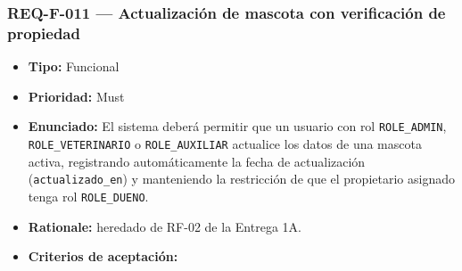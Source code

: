 \documentclass[
  spanish,
]{article}
\providecommand{\tightlist}{%
  \setlength{\itemsep}{0pt}\setlength{\parskip}{0pt}}
\begin{document}
\subsubsection{REQ-F-011 --- Actualización de mascota con verificación
de
propiedad}\label{req-f-011-actualizaciuxf3n-de-mascota-con-verificaciuxf3n-de-propiedad}

\begin{itemize}
\tightlist
\item
  \textbf{Tipo:} Funcional
\item
  \textbf{Prioridad:} Must
\item
  \textbf{Enunciado:} El sistema deberá permitir que un usuario con rol
  \texttt{ROLE\_\allowbreak{}ADMIN}, \texttt{ROLE\_\allowbreak{}VETERINARIO} o
  \texttt{ROLE\_\allowbreak{}AUXILIAR} actualice los datos de una mascota activa,
  registrando automáticamente la fecha de actualización
  (\texttt{actualizado\_\allowbreak{}en}) y manteniendo la restricción de que el
  propietario asignado tenga rol \texttt{ROLE\_\allowbreak{}DUENO}.
\item
  \textbf{Rationale:} heredado de RF-02 de la Entrega 1A.
\item
  \textbf{Criterios de aceptación:}


\end{itemize}
\end{document}
